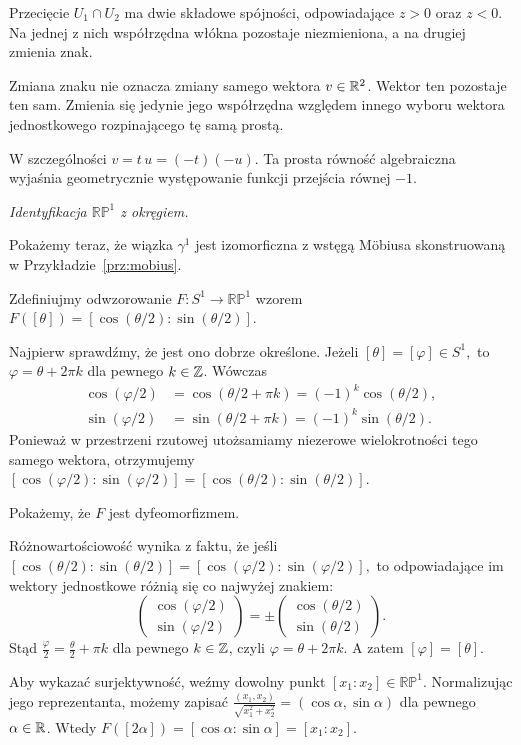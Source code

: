 \begin{przyklad}
Przecięcie $U_1\cap U_2$ ma dwie składowe
spójności, odpowiadające $z>0$ oraz $z<0$.
Na jednej z nich współrzędna włókna
pozostaje niezmieniona, a na drugiej
zmienia znak.

Zmiana znaku nie oznacza zmiany samego
wektora $v\in\mathbb{R}^2$.
Wektor ten pozostaje ten sam.
Zmienia się jedynie jego współrzędna
względem innego wyboru wektora jednostkowego
rozpinającego tę samą prostą.

W szczególności
$
v=t\,u=(-t)(-u).
$
Ta prosta równość algebraiczna wyjaśnia
geometrycznie występowanie funkcji przejścia
równej $-1$.

\medskip
\emph{Identyfikacja $\mathbb{RP}^1$ z okręgiem.}

Pokażemy teraz, że wiązka $\gamma^1$
jest izomorficzna z wstęgą Möbiusa
skonstruowaną w Przykładzie~\ref{prz:mobius}.


Zdefiniujmy odwzorowanie
$
F\colon S^1\longrightarrow\mathbb{RP}^1
$
wzorem $F([\theta]) = [\cos(\theta/2):\sin(\theta/2)]$.

Najpierw sprawdźmy, że jest ono dobrze określone.
Jeżeli
$
[\theta]=[\varphi]\in S^1,
$
to
$
\varphi=\theta+2\pi k
$
dla pewnego $k\in\mathbb{Z}$.
Wówczas
\[
\begin{aligned}
\cos(\varphi/2)
&=\cos(\theta/2+\pi k)
=(-1)^k\cos(\theta/2),\\
\sin(\varphi/2)
&=\sin(\theta/2+\pi k)
=(-1)^k\sin(\theta/2).
\end{aligned}
\]
Ponieważ w przestrzeni rzutowej
utożsamiamy niezerowe wielokrotności
tego samego wektora, otrzymujemy
$
[\cos(\varphi/2):\sin(\varphi/2)]
=
[\cos(\theta/2):\sin(\theta/2)].
$

Pokażemy, że $F$ jest dyfeomorfizmem.

Różnowartościowość wynika z faktu, że
jeśli
$
[\cos(\theta/2):\sin(\theta/2)]
=
[\cos(\varphi/2):\sin(\varphi/2)],
$
to odpowiadające im wektory jednostkowe
różnią się co najwyżej znakiem:
\[
\begin{pmatrix}
\cos(\varphi/2)\\
\sin(\varphi/2)
\end{pmatrix}
=
\pm
\begin{pmatrix}
\cos(\theta/2)\\
\sin(\theta/2)
\end{pmatrix}.
\]
Stąd
$
\frac{\varphi}{2}
=
\frac{\theta}{2}+\pi k
$
dla pewnego $k\in\mathbb{Z}$, czyli
$
\varphi=\theta+2\pi k.
$
A zatem $[\varphi]=[\theta]$.

Aby wykazać surjektywność, weźmy dowolny
punkt $[x_1:x_2]\in\mathbb{RP}^1$.
Normalizując jego reprezentanta, możemy zapisać $\frac{(x_1,x_2)}{\sqrt{x_1^2+x_2^2}} = (\cos\alpha,\sin\alpha)$
dla pewnego $\alpha\in\mathbb{R}$.
Wtedy
$
F([2\alpha])
=
[\cos\alpha:\sin\alpha]
=
[x_1:x_2].
$


\end{przyklad}
